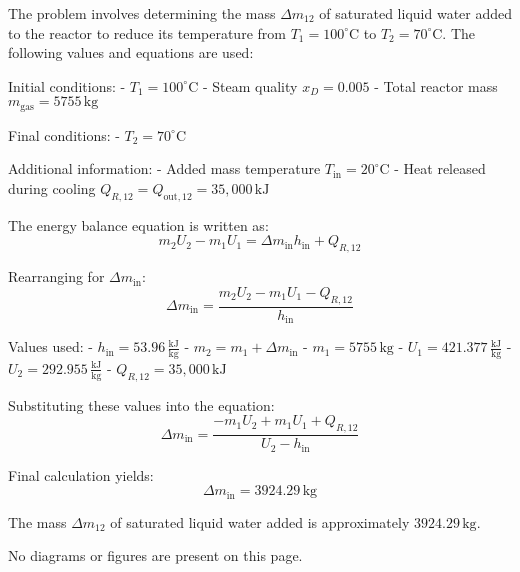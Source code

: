 The problem involves determining the mass \( \Delta m_{12} \) of saturated liquid water added to the reactor to reduce its temperature from \( T_1 = 100^\circ\text{C} \) to \( T_2 = 70^\circ\text{C} \). The following values and equations are used:

Initial conditions:  
- \( T_1 = 100^\circ\text{C} \)  
- Steam quality \( x_D = 0.005 \)  
- Total reactor mass \( m_{\text{gas}} = 5755 \, \text{kg} \)  

Final conditions:  
- \( T_2 = 70^\circ\text{C} \)  

Additional information:  
- Added mass temperature \( T_{\text{in}} = 20^\circ\text{C} \)  
- Heat released during cooling \( Q_{R,12} = Q_{\text{out},12} = 35,000 \, \text{kJ} \)  

The energy balance equation is written as:  
\[
m_2 U_2 - m_1 U_1 = \Delta m_{\text{in}} h_{\text{in}} + Q_{R,12}
\]  

Rearranging for \( \Delta m_{\text{in}} \):  
\[
\Delta m_{\text{in}} = \frac{m_2 U_2 - m_1 U_1 - Q_{R,12}}{h_{\text{in}}}
\]  

Values used:  
- \( h_{\text{in}} = 53.96 \, \frac{\text{kJ}}{\text{kg}} \)  
- \( m_2 = m_1 + \Delta m_{\text{in}} \)  
- \( m_1 = 5755 \, \text{kg} \)  
- \( U_1 = 421.377 \, \frac{\text{kJ}}{\text{kg}} \)  
- \( U_2 = 292.955 \, \frac{\text{kJ}}{\text{kg}} \)  
- \( Q_{R,12} = 35,000 \, \text{kJ} \)  

Substituting these values into the equation:  
\[
\Delta m_{\text{in}} = \frac{-m_1 U_2 + m_1 U_1 + Q_{R,12}}{U_2 - h_{\text{in}}}
\]  

Final calculation yields:  
\[
\Delta m_{\text{in}} = 3924.29 \, \text{kg}
\]  

The mass \( \Delta m_{12} \) of saturated liquid water added is approximately \( 3924.29 \, \text{kg} \).  

No diagrams or figures are present on this page.